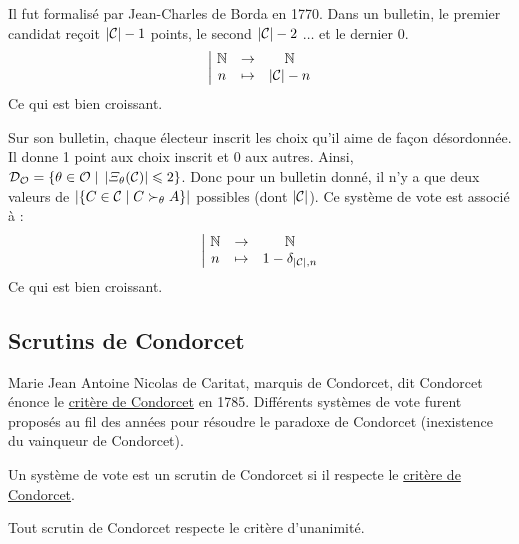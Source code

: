 \begin{definition}
	Il fut formalisé par Jean-Charles de Borda en 1770. Dans un bulletin, le premier candidat reçoit $|\mathcal{C}| - 1$ points, le second $|\mathcal{C}| - 2$ $\ldots$ et le dernier 0.
	\begin{equation}
		\left| \ \begin{matrix}
			\mathbb{N} &\rightarrow& \mathbb{N} \\
			n &\mapsto& |\mathcal{C}| - n
		\end{matrix} \right.
	\end{equation}
	Ce qui est bien croissant.
\end{definition}

\begin{definition}
	Sur son bulletin, chaque électeur inscrit les choix qu'il aime de façon désordonnée. Il donne 1 point aux choix inscrit et 0 aux autres. Ainsi, $\mathcal{D}_\mathcal{O} = \{ \theta \in \mathcal{O} \;|\; \left| \varXi_\theta(\mathcal{C}) \right| \leqslant 2 \}$. Donc pour un bulletin donné, il n'y a que deux valeurs de $\left| \{ C \in \mathcal{C} \;|\; C \succ_\theta A \} \right|$ possibles (dont $|\mathcal{C}|$). Ce système de vote est associé à :
	\begin{equation}
		\left| \ \begin{matrix}
			\mathbb{N} &\rightarrow& \mathbb{N} \\
			n &\mapsto& 1 - \delta_{|\mathcal{C}|, n}
		\end{matrix} \right.
	\end{equation}
	Ce qui est bien croissant.
\end{definition}

\subsection{Scrutins de Condorcet}

Marie Jean Antoine Nicolas de Caritat, marquis de Condorcet, dit Condorcet énonce le \hyperref[Critère de Condorcet]{critère de Condorcet} en 1785.
Différents systèmes de vote furent proposés au fil des années pour résoudre le paradoxe de Condorcet (inexistence du vainqueur de Condorcet).

\begin{definition}
	Un système de vote est un scrutin de Condorcet si il respecte le \hyperref[Critère de Condorcet]{critère de Condorcet}.
\end{definition}

\begin{theoreme}
	Tout scrutin de Condorcet respecte le critère d'unanimité.
\end{theoreme}

